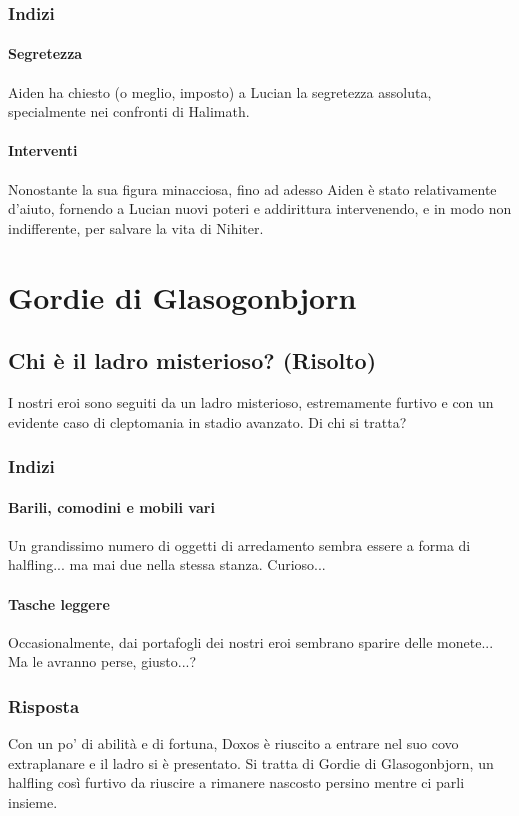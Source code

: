 \documentclass[letterpaper,twocolumn,openany,nodeprecatedcode]{dndbook}
\begin{document}
\subsubsection{Indizi}
\paragraph{Segretezza} Aiden ha chiesto (o meglio, imposto) a Lucian la segretezza assoluta, specialmente nei confronti di Halimath.
\paragraph{Interventi} Nonostante la sua figura minacciosa, fino ad adesso Aiden è stato relativamente d'aiuto, fornendo a Lucian nuovi poteri e addirittura intervenendo, e in modo non indifferente, per salvare la vita di Nihiter.

\section{Gordie di Glasogonbjorn}

\subsection{Chi è il ladro misterioso? (Risolto)}
I nostri eroi sono seguiti da un ladro misterioso, estremamente furtivo e con un evidente caso di cleptomania in stadio avanzato. Di chi si tratta?

\subsubsection{Indizi}
\paragraph{Barili, comodini e mobili vari} Un grandissimo numero di oggetti di arredamento sembra essere a forma di halfling... ma mai due nella stessa stanza. Curioso...
\paragraph{Tasche leggere} Occasionalmente, dai portafogli dei nostri eroi sembrano sparire delle monete... Ma le avranno perse, giusto...?

\subsubsection{Risposta}
Con un po' di abilità e di fortuna, Doxos è riuscito a entrare nel suo covo extraplanare e il ladro si è presentato. Si tratta di Gordie di Glasogonbjorn, un halfling così furtivo da riuscire a rimanere nascosto persino mentre ci parli insieme.
\end{document}
